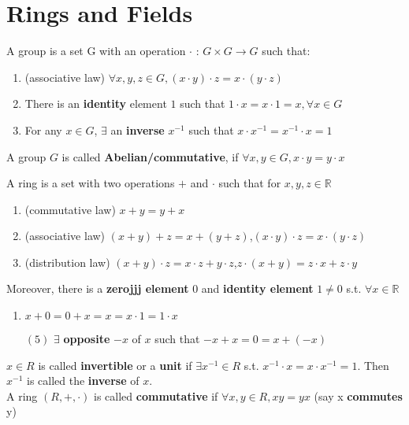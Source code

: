 \section{Rings and Fields}
\begin{definition}[Group]
    A group is a set G with an operation $ \cdot $ :  $ G\times G\rightarrow G $ such that:
    \begin{enumerate}[$ (1) $]
        \item (associative law) $ \forall x,y,z\in G, (x\cdot y)\cdot z=x\cdot(y\cdot z)$
        \item There is an \textbf{identity} element  $ 1 $ such that  $ 1\cdot x=x\cdot 1=x,\forall x\in G $
        \item For any  $ x\in G $,  $ \exists $ an \textbf{inverse}  $ x^{-1} $ such that  $ x\cdot x^{-1}=x^{-1}\cdot x=1 $       
    \end{enumerate}
    A group  $ G  $ is called \textbf{Abelian/commutative}, if  $ \forall x,y\in G ,x\cdot y=y\cdot x $ 
\end{definition}
\begin{definition}[Ring]
    A ring is a set with two operations  $ + $ and $ \cdot $ such that for  $ x,y,z\in\mathbb{R} $ 
    \begin{enumerate}[$ (1) $]
        \item (commutative law) $ x+y=y+x $ 
        \item (associative law) $ (x+y)+z=x+(y+z) $,\quad  $ (x\cdot y)\cdot z=x\cdot (y\cdot z) $
        \item (distribution law) $ (x+y)\cdot z=x\cdot z+y\cdot z $,\quad  $ z\cdot (x+y)=z\cdot x+z\cdot y $       
    \end{enumerate}   
    Moreover, there is a \textbf{zerojjj element}  $ 0 $   and \textbf{identity element}  $ 1\not=0 $ s.t.  $ \forall x\in \mathbb{R}$  
    \begin{enumerate}[$ (4) $]
        \item $ x+0=0+x=x=x\cdot 1=1\cdot x $ 
        \item[$ (5) $]  $ \exists $ \textbf{opposite}  $ -x $ of  $ x $ such that  $ -x+x=0=x+(-x) $ 
    \end{enumerate} 
     $ x\in R $ is called \textbf{invertible} or a \textbf{unit} if  $ \exists x^{-1}\in R  $ s.t.  $ x^{-1}\cdot x=x\cdot x^{-1}=1  $. 
     Then  $ x^{-1} $ is called the \textbf{inverse} of  $ x $.\\
     A ring  $ (R,+,\cdot ) $ is called \textbf{commutative} if  $ \forall x,y\in R, xy=yx $ (say x \textbf{commutes} y)

\end{definition}
